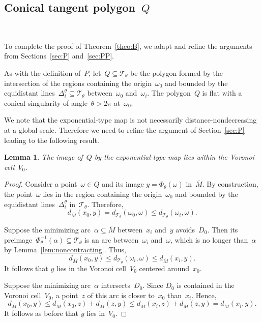 \documentclass[12pt,reqno]{amsart}
\newtheorem{lemma}[theorem]{Lemma}
\theoremstyle{definition}
\numberwithin{equation}{section}
\numberwithin{equation}{section}
\begin{document}
\subsection{Conical tangent polygon~$Q$}

\mbox{ } \medskip

To complete the proof of Theorem~\ref{theo:B}, we adapt and refine
the arguments from Sections~\ref{sec:P} and~\ref{sec:PP}.

\medskip

As with the definition of~$P$, let~$Q \subseteq \mathcal{T}_\theta$ be the polygon formed by the intersection of the regions containing the origin~$\omega_0$ and bounded by the equidistant lines~$\Delta_i^\theta \subseteq \mathcal{T}_\theta$ between~$\omega_0$ and~$\omega_i$.
The polygon~$Q$ is flat with a conical singularity of angle~$\theta>2\pi$ at~$\omega_0$.

We note that the exponential-type map is not necessarily
distance-nondecreasing at a global scale.  Therefore we need to refine
the argument of Section~\ref{sec:P} leading to the following result.

\begin{lemma}
The image of~$Q$ by the exponential-type map lies within the Voronoi cell~$V_0$.
\end{lemma}

\begin{proof}
Consider a point~$\omega \in Q$ and its image $y=\Phi_\theta(\omega)$ in~$\bar{M}$.
By construction, the point~$\omega$ lies in the region containing the origin~$\omega_0$ and bounded by the equidistant lines~$\Delta_i^\theta$ in~$\mathcal{T}_\theta$.
Therefore,
\[
d_{\bar{M}}(x_0,y) = d_{\mathcal{T}_\theta}(\omega_0,\omega) \leq d_{\mathcal{T}_\theta}(\omega_i,\omega).
\]

Suppose the minimizing arc~$\alpha \subseteq \bar{M}$ between~$x_i$ and~$y$ avoids~$D_0$.
Then its preimage~$\Phi^{-1}_\theta(\alpha) \subseteq \mathcal{T}_\theta$ is an arc between~$\omega_i$ and~$\omega$, which is no longer than~$\alpha$ by Lemma~\ref{lem:noncontracting}.
Thus,
\[
d_{\bar{M}}(x_0,y) \leq d_{\mathcal{T}_\theta}(\omega_i,\omega) \leq d_{\bar{M}}(x_i,y).
\]
It follows that $y$ lies in the Voronoi cell~$V_0$ centered around~$x_0$.

Suppose the minimizing arc~$\alpha$ intersects~$D_0$.
Since $D_0$ is contained in the Voronoi cell~$V_0$, a point~$z$ of this arc is closer to~$x_0$ than~$x_i$.
Hence,
\[
d_{\bar{M}}(x_0,y) \leq d_{\bar{M}}(x_0,z) + d_{\bar{M}}(z,y) \leq d_{\bar{M}}(x_i,z) + d_{\bar{M}}(z,y) = d_{\bar{M}}(x_i,y).
\]
It follows as before that $y$ lies in~$V_0$.
\end{proof}
\end{document}
